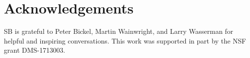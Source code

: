 \documentclass[11pt,twoside]{article}
\theoremstyle{definition}
\newcommand{\1}{\mathbf{1}}
\begin{document}
\section*{Acknowledgements}

SB is grateful to Peter Bickel, Martin Wainwright, and Larry Wasserman for
helpful and inspiring conversations. This work was supported in part by the NSF grant DMS-1713003.


 

\clearpage

\appendix

\end{document}

